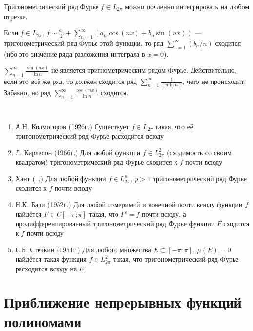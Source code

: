 \begin{corollary}
	Тригонометрический ряд Фурье $f \in L_{2\pi}$ можно почленно интегрировать на любом отрезке.
\end{corollary}

\begin{corollary}
	Если $f \in L_{2\pi}$, $f \sim \frac{a_0}{2} + \sum_{n = 1}^\infty (a_n\cos(nx) + b_n\sin(nx))$ --- тригонометрический ряд Фурье этой функции, то ряд $\sum_{n = 1}^\infty (b_n / n)$ сходится (ибо это значение ряда-разложения интеграла в $x = 0$).
\end{corollary}

\begin{example}
	$\sum_{n = 1}^\infty \frac{\sin(nx)}{\ln n}$ не является тригнометрическим рядом Фурье. Действительно, если это всё же ряд, то должен сходится ряд $\sum_{n = 1}^\infty \frac{1}{(n\ln n)}$, чего не происходит. Забавно, но ряд $\sum_{n = 1}^\infty \frac{\cos(nx)}{\ln n}$ сходится.
\end{example}

\begin{note}~
	\begin{enumerate}
		\item А.Н. Колмогоров (1926г.) Существует $f \in L_{2\pi}$ такая, что её тригонометрический ряд Фурье расходится всюду
		
		\item Л. Карлесон (1966г.) Для любой функции $f \in L_{2\pi}^2$ (сходимость со своим квадратом) тригонометрический ряд Фурье сходится к $f$ почти всюду
		
		\item Хант (...) Для любой функции $f \in L_{2\pi}^p,\ p > 1$ тригонометрический ряд Фурье сходится к $f$ почти всюду
		
		\item Н.К. Бари (1952г.) Для любой измеримой и конечной почти всюду функции $f$ найдётся $F \in C[-\pi; \pi]$ такая, что $F' = f$ почти всюду, а продифференцированный тригонометрический ряд Фурье функции $F$ сходится к $f$ почти всюду
		
		\item С.Б. Стечкин (1951г.) Для любого множества $E \subset [-\pi; \pi],\ \mu(E) = 0$ найдётся такая функция $f \in L_{2\pi}^2$ такая, что тригонометрический ряд Фурье расходится всюду на $E$
	\end{enumerate}
\end{note}

\section{Приближение непрерывных функций полиномами}

